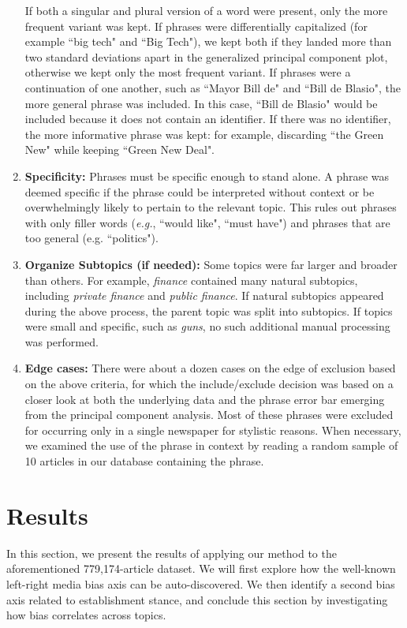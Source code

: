 \documentclass[10pt,letterpaper]{article}
\def\eg{{\frenchspacing\it e.g.}}
\begin{document}
\begin{enumerate}
If both a singular and plural version of a word were present, only the more frequent variant was kept.
If phrases were differentially capitalized (for example ``big tech" and ``Big Tech"), we kept both if they landed more than two standard deviations apart in the generalized principal component plot, otherwise we kept only the most frequent variant.
If phrases were a continuation of one another, such as ``Mayor Bill de" and ``Bill de Blasio", the more general phrase was included. In this case, ``Bill de Blasio" would be included because it does not contain an identifier. If there was no identifier, the more informative phrase was kept: for example, discarding ``the Green New" while keeping ``Green New Deal".
\item {\bf Specificity:} Phrases must be specific enough to stand alone. A phrase was deemed specific if the phrase could be interpreted without context or be overwhelmingly likely to pertain to the relevant topic. This rules out phrases with only filler words (\eg, ``would like", ``must have") and phrases that are too general (e.g. ``politics").
\item { \bf Organize Subtopics (if needed): } Some topics were far larger and broader than others. For example, \textit{finance} contained many natural subtopics, including \textit{private finance} and \textit{public finance}. If natural subtopics appeared during the above process, the parent topic was split into subtopics. If topics were small and specific, such as \textit{guns}, no such additional manual processing was performed. 
\item {\bf Edge cases:} There were about a dozen cases on the edge of exclusion based on the above criteria, for which the include/exclude decision was based on a closer look at both the underlying data and the phrase error bar emerging from the principal component analysis. Most of these phrases were excluded for occurring only in a single newspaper for stylistic reasons. When necessary, we examined the use of the phrase in context by reading a random sample of 10 articles in our database containing the phrase. 
\end{enumerate}



\section*{Results}

In this section, we present the results of applying our method to the aforementioned 779,174-article dataset.
We will first explore how the well-known left-right media bias axis can be auto-discovered. We then identify a second bias axis related to establishment stance, and conclude this section by investigating how bias correlates across topics.
\end{document}
